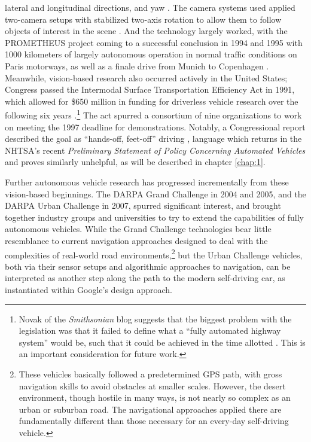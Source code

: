 lateral and longitudinal directions, and yaw \cite[p.
  2]{ulmerVITA-II}. The camera systems used 
applied two-camera setups with stabilized two-axis rotation to allow
them to follow objects of interest in the scene \cite{cameraPlatform}. And the
technology largely worked, with the PROMETHEUS project coming to a
successful conclusion in 1994 and 1995 with 1000 kilometers of largely
autonomous operation in normal traffic conditions on Paris motorways,
as well as a finale drive from Munich to Copenhagen \cite{makingBertha}.
Meanwhile, vision-based research also occurred actively in the United States;
Congress passed the Intermodal 
Surface Transportation Efficiency Act in 1991, which allowed for \$650 million
in funding for driverless vehicle research over the following six
years
\cite{novakAlmost}.\footnote{Novak
of the \emph{Smithsonian} blog suggests that the biggest problem with
the legislation was that it failed to define what a ``fully automated
highway system'' would be, such that it could be achieved in the time
allotted \cite{novakAlmost}. This is an important consideration for
future work.} The act spurred a consortium of nine organizations to
work on meeting the 1997 deadline for demonstrations.
Notably, a Congressional report described the goal as ``hands-off,
feet-off'' driving \cite{novakAlmost}, language which returns in the NHTSA's recent
\emph{Preliminary Statement of Policy Concerning Automated Vehicles}
and proves similarly unhelpful, as will be described in chapter
\ref{chap:1}.


Further autonomous vehicle research has progressed incrementally from
these vision-based beginnings. The
DARPA Grand Challenge in 2004 and 2005, and the DARPA Urban Challenge
in 2007, spurred significant interest, and brought together industry
groups and universities to 
try to extend the capabilities of fully autonomous vehicles. While the
Grand Challenge technologies bear little resemblance to current
navigation approaches designed to deal with the complexities of
real-world road environments,\footnote{These vehicles basically
  followed a predetermined GPS path, with gross navigation skills to
  avoid obstacles at smaller scales. However, the desert environment,
  though hostile in many ways, is not nearly so complex as an urban or
suburban road. The navigational approaches applied there are
fundamentally different than those necessary for an every-day
self-driving vehicle.} but the Urban Challenge
vehicles, both via their sensor setups and algorithmic approaches to
navigation, can be interpreted as another step along the path to the
modern self-driving car, as instantiated within Google's design approach. 

